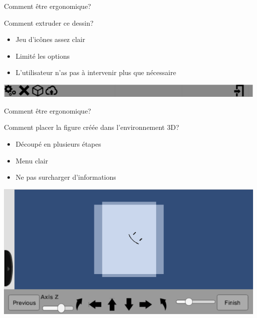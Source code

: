 \documentclass[a4paper,10pt]{beamer}
\begin{document}
		\begin{frame}{Comment être ergonomique?}
			
			Comment extruder ce dessin?
			\begin{itemize}
				\item Jeu d'icônes assez clair
				\item Limité les options
				\item L'utilisateur n'as pas à intervenir plus que nécessaire
			\end{itemize}
			
			\centerline{\includegraphics[scale=0.5]{images/Nono/img3.png}} 
			
			
			
		\end{frame}	
			
		\begin{frame}{Comment être ergonomique?}
						
				Comment placer la figure créée dans l'environnement 3D?
				
				\begin{itemize}
					\item Découpé en plusieurs étapes
					\item Menu clair
					\item Ne pas surcharger d'informations
				\end{itemize}
				
				\centerline{\includegraphics[scale=0.5]{images/Nono/img4.png}} 
						
						
						
		\end{frame}	
		
\end{document}
